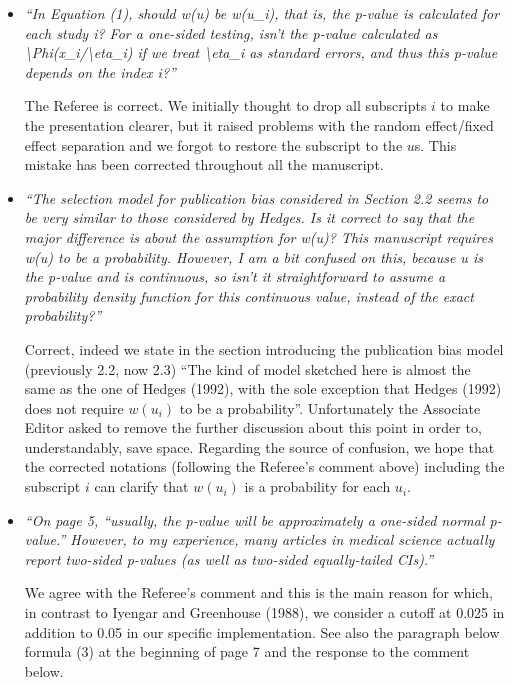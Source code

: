 \documentclass[11pt]{article}
\begin{document}
\begin{itemize}
\item \emph{``In Equation (1), should w(u) be w(u\_i), that is, the p-value is calculated for each study i? For a one-sided testing, isn't the p-value calculated as \textbackslash Phi(\textbar x\_i\textbar/\textbackslash eta\_i) if we treat \textbackslash eta\_i as standard errors, and thus this p-value depends on the index i?''}


The Referee is correct. We initially thought to drop all subscripts $i$ to make the presentation clearer, but it raised problems with the random effect/fixed effect separation and we forgot to restore the subscript to the $u$s. This mistake has been corrected throughout all the manuscript.



\item \emph{``The selection model for publication bias considered in Section 2.2 seems to be very similar to those considered by Hedges. Is it correct to say that the major difference is about the assumption for w(u)? This manuscript requires w(u) to be a probability. However, I am a bit confused on this, because u is the p-value and is continuous, so isn't it straightforward to assume a probability density function for this continuous value, instead of the exact probability?''}


Correct, indeed we state in the section introducing the publication bias model (previously 2.2, now 2.3) ``The kind of model sketched here is almost the same as the one of Hedges (1992), with the sole exception that Hedges (1992) does not require $w(u_i)$ to be a probability''. Unfortunately the Associate Editor asked to remove the further discussion about this point in order to, understandably, save space. Regarding the source of confusion, we hope that the corrected notations (following the Referee's comment above) including the subscript $i$ can clarify that $w(u_i)$ is a probability for each $u_i$.



\item \emph{``On page 5, ``usually, the p-value will be approximately a one-sided normal p-value.'' However, to my experience, many articles in medical science actually report two-sided p-values (as well as two-sided equally-tailed CIs).''}


We agree with the Referee's comment and this is the main reason for which, in contrast to Iyengar and Greenhouse (1988), we consider a cutoff at 0.025 in addition to 0.05 in our specific implementation. See also the paragraph below formula (3) at the beginning of page 7 and the response to the comment below.




\end{itemize}
\end{document}
